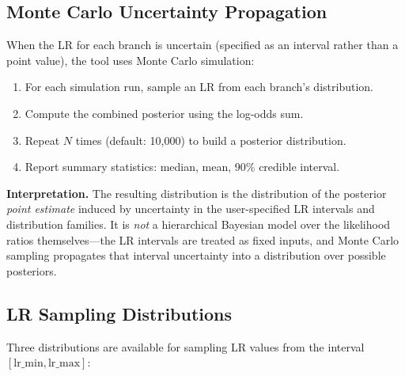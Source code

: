 \documentclass[11pt,a4paper]{article}
\begin{document}
\subsection{Monte Carlo Uncertainty Propagation}

When the LR for each branch is uncertain (specified as an interval rather than
a point value), the tool uses Monte Carlo simulation:

\begin{enumerate}
\item For each simulation run, sample an LR from each branch's distribution.
\item Compute the combined posterior using the log-odds sum.
\item Repeat $N$ times (default: 10{,}000) to build a posterior distribution.
\item Report summary statistics: median, mean, 90\% credible interval.
\end{enumerate}

\textbf{Interpretation.}  The resulting distribution is the distribution of the
posterior \emph{point estimate} induced by uncertainty in the user-specified LR
intervals and distribution families.  It is \emph{not} a hierarchical Bayesian
model over the likelihood ratios themselves---the LR intervals are treated as
fixed inputs, and Monte Carlo sampling propagates that interval uncertainty
into a distribution over possible posteriors.

\subsection{LR Sampling Distributions}

Three distributions are available for sampling LR values from the interval
$[\text{lr\_min}, \text{lr\_max}]$:
\end{document}
